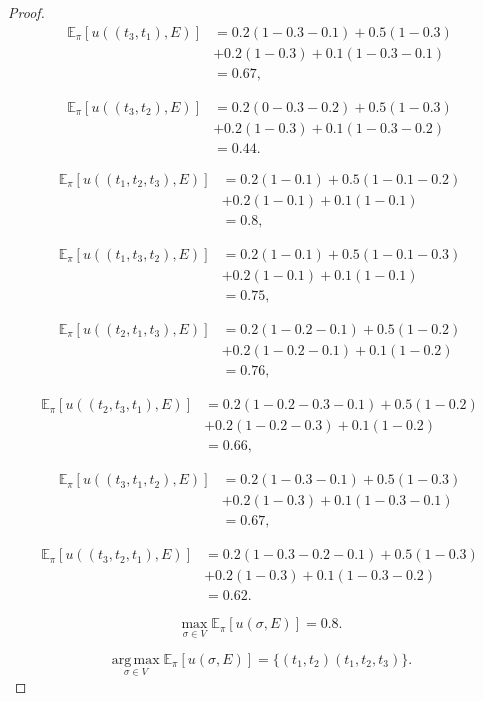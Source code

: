 \documentclass[11pt,letterpaper]{article}
\begin{document}
\begin{proof}
    \[
    \begin{aligned}
    \mathbb{E}_\pi[u((t_3,t_1),E)] &=0.2(1-0.3-0.1)+0.5(1-0.3)\\ &+0.2(1-0.3)+0.1(1-0.3-0.1)\\ &={0.67},
    \end{aligned}
    \]
    
    \[
    \begin{aligned}
    \mathbb{E}_\pi[u((t_3,t_2),E)] &=0.2(0-0.3-0.2)+0.5(1-0.3)\\ &+0.2(1-0.3)+0.1(1-0.3-0.2)\\ &={0.44}.
    \end{aligned}
    \]
    
    \[
    \begin{aligned}
    \mathbb{E}_\pi[u((t_1,t_2,t_3),E)] &=0.2(1-0.1)+0.5(1-0.1-0.2)\\ &+0.2(1-0.1)+0.1(1-0.1)\\ &={0.8},
    \end{aligned}
    \]
    
    \[
    \begin{aligned}
    \mathbb{E}_\pi[u((t_1,t_3,t_2),E)] &=0.2(1-0.1)+0.5(1-0.1-0.3)\\ &+0.2(1-0.1)+0.1(1-0.1)\\ &={0.75},
    \end{aligned}
    \]
    
    \[
    \begin{aligned}
    \mathbb{E}_\pi[u((t_2,t_1,t_3),E)] &=0.2(1-0.2-0.1)+0.5(1-0.2)\\ &+0.2(1-0.2-0.1)+0.1(1-0.2)\\ &={0.76},
    \end{aligned}
    \]
    
    \[
    \begin{aligned}
    \mathbb{E}_\pi[u((t_2,t_3,t_1),E)] &=0.2(1-0.2-0.3-0.1)+0.5(1-0.2)\\ &+0.2(1-0.2-0.3)+0.1(1-0.2)\\ &={0.66},
    \end{aligned}
    \]
    
    \[
    \begin{aligned}
    \mathbb{E}_\pi[u((t_3,t_1,t_2),E)] &=0.2(1-0.3-0.1)+0.5(1-0.3)\\ &+0.2(1-0.3)+0.1(1-0.3-0.1)\\ &={0.67},
    \end{aligned}
    \]
    
    \[
    \begin{aligned}
    \mathbb{E}_\pi[u((t_3,t_2,t_1),E)] &=0.2(1-0.3-0.2-0.1)+0.5(1-0.3)\\ &+0.2(1-0.3)+0.1(1-0.3-0.2)\\ &={0.62}.
    \end{aligned}
    \]

    \[
    \max_{\sigma\in V}\mathbb{E}_\pi[u(\sigma,E)]=0.8.
    \]

    \[
    \operatorname*{arg\,max}_{\sigma\in V}\mathbb{E}_\pi[u(\sigma,E)]=\{(t_1,t_2)(t_1,t_2,t_3)\}.
    \]


\end{proof}
\end{document}
